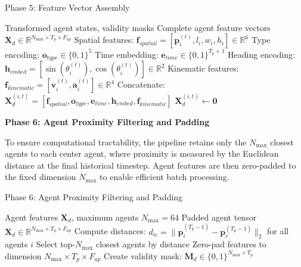 \begin{algorithm}[H]
\caption{Phase 5: Feature Vector Assembly}
\label{alg:phase5_features}
\begin{algorithmic}[1]
\REQUIRE Transformed agent states, validity masks
\ENSURE Complete agent feature vectors \(\boldsymbol{X}_d \in \mathbb{R}^{N_{\max} \times T_p \times F_{ap}}\)
    \STATE Spatial features: \(\boldsymbol{f}_{spatial} = [\boldsymbol{p}_i^{(t)}, l_i, w_i, h_i] \in \mathbb{R}^6\)
    \STATE Type encoding: \(\boldsymbol{o}_{type} \in \{0,1\}^5\)
    \STATE Time embedding: \(\boldsymbol{e}_{time} \in \{0,1\}^{T_p+1}\)
    \STATE Heading encoding: \(\boldsymbol{h}_{embed} = [\sin(\theta_i^{(t)}), \cos(\theta_i^{(t)})] \in \mathbb{R}^2\)
    \STATE Kinematic features: \(\boldsymbol{f}_{kinematic} = [\boldsymbol{v}_i^{(t)}, \boldsymbol{a}_i^{(t)}] \in \mathbb{R}^4\)
    \STATE Concatenate: \(\boldsymbol{X}_d^{(i,t)} = [\boldsymbol{f}_{spatial}, \boldsymbol{o}_{type}, \boldsymbol{e}_{time}, \boldsymbol{h}_{embed}, \boldsymbol{f}_{kinematic}]\)
        \STATE \(\boldsymbol{X}_d^{(i,t)} \leftarrow \boldsymbol{0}\)
    \ENDIF
\ENDFOR
\end{algorithmic}
\end{algorithm}

\textbf{Phase 6: Agent Proximity Filtering and Padding}

To ensure computational tractability, the pipeline retains only the \(N_{\max}\) closest agents to each center agent, where proximity is measured by the Euclidean distance at the final historical timestep. Agent features are then zero-padded to the fixed dimension \(N_{\max}\) to enable efficient batch processing.

\begin{algorithm}[H]
\caption{Phase 6: Agent Proximity Filtering and Padding}
\label{alg:phase6_proximity}
\begin{algorithmic}[1]
\REQUIRE Agent features \(\boldsymbol{X}_d\), maximum agents \(N_{\max} = 64\)
\ENSURE Padded agent tensor \(\boldsymbol{X}_d \in \mathbb{R}^{N_{\max} \times T_p \times F_{ap}}\)
    \STATE Compute distances: \(d_{ic} = \|\boldsymbol{p}_i^{(T_p-1)} - \boldsymbol{p}_c^{(T_p-1)}\|_2\) for all agents \(i\)
    \STATE Select top-\(N_{\max}\) closest agents by distance
    \STATE Zero-pad features to dimension \(N_{\max} \times T_p \times F_{ap}\)
    \STATE Create validity mask: \(\boldsymbol{M}_d \in \{0,1\}^{N_{\max} \times T_p}\)
\ENDFOR
\end{algorithmic}
\end{algorithm}

